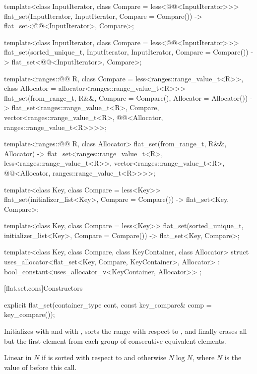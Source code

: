 \begin{codeblock}
{  template<class InputIterator, class Compare = less<@@<InputIterator>>>
    flat_set(InputIterator, InputIterator, Compare = Compare())
      -> flat_set<@@<InputIterator>, Compare>;

  template<class InputIterator, class Compare = less<@@<InputIterator>>>
    flat_set(sorted_unique_t, InputIterator, InputIterator, Compare = Compare())
      -> flat_set<@@<InputIterator>, Compare>;

  template<ranges::@@ R, class Compare = less<ranges::range_value_t<R>>,
           class Allocator = allocator<ranges::range_value_t<R>>>
    flat_set(from_range_t, R&&, Compare = Compare(), Allocator = Allocator())
      -> flat_set<ranges::range_value_t<R>, Compare,
                  vector<ranges::range_value_t<R>,
                         @@<Allocator, ranges::range_value_t<R>>>>;

  template<ranges::@@ R, class Allocator>
    flat_set(from_range_t, R&&, Allocator)
      -> flat_set<ranges::range_value_t<R>, less<ranges::range_value_t<R>>,
                  vector<ranges::range_value_t<R>,
                         @@<Allocator, ranges::range_value_t<R>>>>;

  template<class Key, class Compare = less<Key>>
    flat_set(initializer_list<Key>, Compare = Compare())
      -> flat_set<Key, Compare>;

  template<class Key, class Compare = less<Key>>
    flat_set(sorted_unique_t, initializer_list<Key>, Compare = Compare())
      -> flat_set<Key, Compare>;

  template<class Key, class Compare, class KeyContainer, class Allocator>
    struct uses_allocator<flat_set<Key, Compare, KeyContainer>, Allocator>
      : bool_constant<uses_allocator_v<KeyContainer, Allocator>> { };
}
\end{codeblock}

[flat.set.cons]{Constructors}

%
\begin{itemdecl}
explicit flat_set(container_type cont, const key_compare& comp = key_compare());
\end{itemdecl}

\begin{itemdescr}
\pnum
\effects
Initializes  with  and
 with ,
sorts the range  with respect to , and
finally erases all but the first element
from each group of consecutive equivalent elements.

\pnum
\complexity
Linear in $N$ if  is sorted with respect to  and
otherwise $N \log N$, where $N$ is the value of  before this call.
\end{itemdescr}


